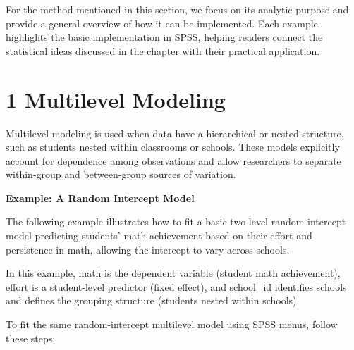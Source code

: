 \documentclass[
  letterpaper,
  DIV=11,
  numbers=noendperiod]{scrreprt}
\begin{document}
For the method mentioned in this section, we focus on its analytic
purpose and provide a general overview of how it can be implemented.
Each example highlights the basic implementation in SPSS, helping
readers connect the statistical ideas discussed in the chapter with
their practical application.

\section*{1 Multilevel Modeling}\label{multilevel-modeling-1}


Multilevel modeling is used when data have a hierarchical or nested
structure, such as students nested within classrooms or schools. These
models explicitly account for dependence among observations and allow
researchers to separate within-group and between-group sources of
variation.

\textbf{Example: A Random Intercept Model}

The following example illustrates how to fit a basic two-level
random-intercept model predicting students' math achievement based on
their effort and persistence in math, allowing the intercept to vary
across schools.

In this example, math is the dependent variable (student math
achievement), effort is a student-level predictor (fixed effect), and
school\_id identifies schools and defines the grouping structure
(students nested within schools).

To fit the same random-intercept multilevel model using SPSS menus,
follow these steps:
\end{document}
